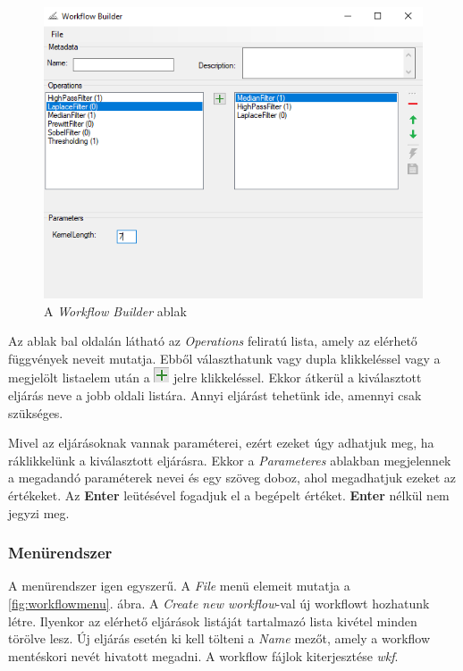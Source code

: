 \documentclass[a4paper,12pt]{article}
\begin{document}
	\begin{figure}      
	\centering
	\includegraphics[width=12cm]{workflow_main}
	\caption{A \textit{Workflow Builder} ablak}
	\label{fig:workflowmain} 
    \end{figure}

Az ablak bal oldalán látható az \textit{Operations} feliratú lista, amely az elérhető függvények neveit mutatja. Ebből választhatunk vagy dupla klikkeléssel vagy a megjelölt listaelem után a \includegraphics[width=0.4 cm]{zoldplus} jelre klikkeléssel. Ekkor átkerül a kiválasztott eljárás neve a jobb oldali listára. Annyi eljárást tehetünk ide, amennyi csak szükséges.

Mivel az eljárásoknak vannak paraméterei, ezért ezeket úgy adhatjuk meg, ha ráklikkelünk a kiválasztott eljárásra. Ekkor a \textit{Parameteres} ablakban megjelennek a megadandó paraméterek nevei és egy szöveg doboz, ahol megadhatjuk ezeket az értékeket. Az \textbf{Enter} leütésével fogadjuk el a begépelt értéket. \textbf{Enter} nélkül nem jegyzi meg.

\subsubsection{Menürendszer}

A menürendszer igen egyszerű. A \textit{File} menü elemeit mutatja a \ref{fig:workflowmenu}. ábra. A \textit{Create new workflow}-val új workflowt hozhatunk létre. Ilyenkor az elérhető eljárások listáját tartalmazó lista kivétel minden törölve lesz. Új eljárás esetén ki kell tölteni a \textit{Name} mezőt, amely a workflow mentéskori nevét hivatott megadni. A workflow fájlok kiterjesztése \textit{wkf}.
\end{document}
